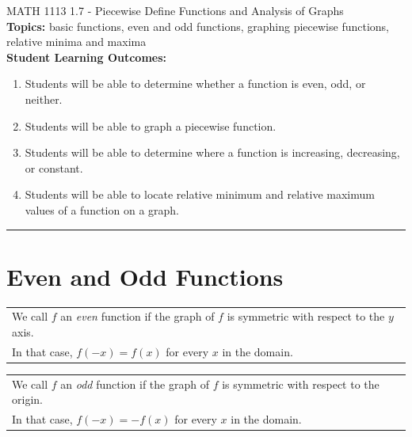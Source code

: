 \documentclass[11pt]{article}
\begin{document}
\noindent MATH 1113   \hfill 1.7 - Piecewise Define Functions and Analysis of Graphs\\



\noindent \textbf{Topics:}  basic functions, even and odd functions, graphing piecewise functions, relative minima and maxima\\

\noindent \textbf{Student Learning Outcomes:}
\begin{enumerate}
\item Students will be able to determine whether a function is even, odd, or neither.
\item Students will be able to graph a piecewise function.
\item Students will be able to determine where a function is increasing, decreasing, or constant.
\item  Students will be able to locate relative minimum and relative maximum values of a function on a graph.
\end{enumerate}

\hrule 
\vspace{5mm}
\section{Even and Odd Functions}


\noindent \begin{tabular}{| l |} \hline
We call $f$ an \emph{even} function if the graph of $f$ is symmetric with respect to the $y$ axis.\\ In that case, $f(-x)=f(x)$ for every $x$ in the domain. \\ \hline
\end{tabular}



\noindent \begin{tabular}{| l |} \hline
We call $f$ an \emph{odd} function if the graph of $f$ is symmetric with respect to the origin.\\ In that case, $f(-x)=-f(x)$ for every $x$ in the domain. \\ \hline
\end{tabular}
\end{document}
